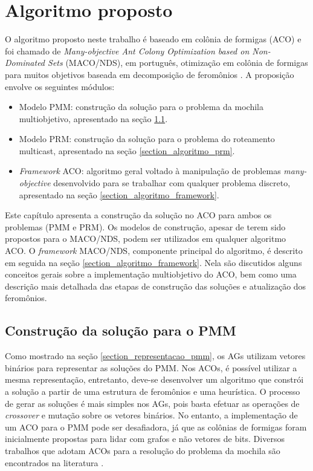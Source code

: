 \chapter[Algoritmo proposto]{Algoritmo proposto}
\label{chapter_macod}

O algoritmo proposto neste trabalho é baseado em colônia de formigas (ACO) e foi chamado de \textit{Many-objective Ant Colony Optimization based on Non-Dominated Sets} (MACO/NDS), em português, otimização em colônia de formigas para muitos objetivos baseada em decomposição de feromônios \cite{Franca2018}. A proposição envolve os seguintes módulos:

\begin{itemize}
	\item Modelo PMM: construção da solução para o problema da mochila multiobjetivo, apresentado na seção \ref{section_algoritmo_pmm}.
	\item Modelo PRM: construção da solução para o problema do roteamento multicast, apresentado na seção \ref{section_algoritmo_prm}.
	\item \textit{Framework} ACO: algoritmo geral voltado à manipulação de problemas \textit{many-objective} desenvolvido para se trabalhar com qualquer problema discreto, apresentado na seção \ref{section_algoritmo_framework}.
\end{itemize}

Este capítulo apresenta a construção da solução no ACO para ambos os problemas (PMM e PRM). Os modelos de construção, apesar de terem sido propostos para o MACO/NDS, podem ser utilizados em qualquer algoritmo ACO. O \textit{framework} MACO/NDS, componente principal do algoritmo, é descrito em seguida na seção \ref{section_algoritmo_framework}. Nela são discutidos alguns conceitos gerais sobre a implementação multiobjetivo do ACO, bem como uma descrição mais detalhada das etapas de construção das soluções e atualização dos feromônios.

\section{Construção da solução para o PMM}
\label{section_algoritmo_pmm}

Como mostrado na seção \ref{section_representacao_pmm}, os AGs utilizam vetores binários para representar as soluções do PMM. Nos ACOs, é possível utilizar a mesma representação, entretanto, deve-se desenvolver um algoritmo que constrói a solução a partir de uma estrutura de feromônios e uma heurística. O processo de gerar as soluções é mais simples nos AGs, pois basta efetuar as operações de \textit{crossover} e mutação sobre os vetores binários. No entanto, a implementação de um ACO para o PMM pode ser desafiadora, já que as colônias de formigas foram inicialmente propostas para lidar com grafos e não vetores de bits. Diversos trabalhos que adotam ACOs para a resolução do problema da mochila são encontrados na literatura \cite{Ke2010,kong2008,changdar2013,Alaya2004,Alaya2007}.

